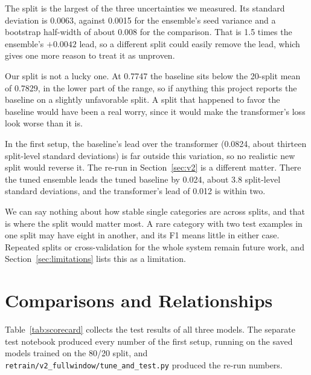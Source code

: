 The split is the largest of the three uncertainties we measured. Its standard deviation is 0.0063, against 0.0015 for the ensemble's seed variance and a bootstrap half-width of about 0.008 for the comparison. That is 1.5 times the ensemble's $+0.0042$ lead, so a different split could easily remove the lead, which gives one more reason to treat it as unproven.

Our split is not a lucky one. At 0.7747 the baseline sits below the 20-split mean of 0.7829, in the lower part of the range, so if anything this project reports the baseline on a slightly unfavorable split. A split that happened to favor the baseline would have been a real worry, since it would make the transformer's loss look worse than it is.

In the first setup, the baseline's lead over the transformer (0.0824, about thirteen split-level standard deviations) is far outside this variation, so no realistic new split would reverse it. The re-run in Section~\ref{sec:v2} is a different matter. There the tuned ensemble leads the tuned baseline by 0.024, about 3.8 split-level standard deviations, and the transformer's lead of 0.012 is within two.

We can say nothing about how stable single categories are across splits, and that is where the split would matter most. A rare category with two test examples in one split may have eight in another, and its F1 means little in either case. Repeated splits or cross-validation for the whole system remain future work, and Section~\ref{sec:limitations} lists this as a limitation.

\section{Comparisons and Relationships}
Table~\ref{tab:scorecard} collects the test results of all three models. The separate test notebook produced every number of the first setup, running on the saved models trained on the 80/20 split, and \texttt{retrain/v2\_fullwindow/tune\_and\_test.py} produced the re-run numbers.

